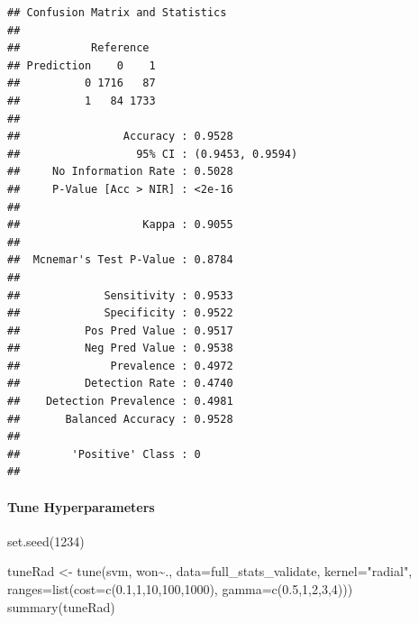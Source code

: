 \documentclass[
]{article}
\newenvironment{Shaded}{\begin{snugshade}}{\end{snugshade}}
\newcommand{\AttributeTok}[1]{\textcolor[rgb]{0.77,0.63,0.00}{#1}}
\newcommand{\DecValTok}[1]{\textcolor[rgb]{0.00,0.00,0.81}{#1}}
\newcommand{\FloatTok}[1]{\textcolor[rgb]{0.00,0.00,0.81}{#1}}
\newcommand{\FunctionTok}[1]{\textcolor[rgb]{0.00,0.00,0.00}{#1}}
\newcommand{\NormalTok}[1]{#1}
\newcommand{\OtherTok}[1]{\textcolor[rgb]{0.56,0.35,0.01}{#1}}
\newcommand{\SpecialCharTok}[1]{\textcolor[rgb]{0.00,0.00,0.00}{#1}}
\newcommand{\StringTok}[1]{\textcolor[rgb]{0.31,0.60,0.02}{#1}}
\begin{document}
\begin{verbatim}
## Confusion Matrix and Statistics
## 
##           Reference
## Prediction    0    1
##          0 1716   87
##          1   84 1733
##                                           
##                Accuracy : 0.9528          
##                  95% CI : (0.9453, 0.9594)
##     No Information Rate : 0.5028          
##     P-Value [Acc > NIR] : <2e-16          
##                                           
##                   Kappa : 0.9055          
##                                           
##  Mcnemar's Test P-Value : 0.8784          
##                                           
##             Sensitivity : 0.9533          
##             Specificity : 0.9522          
##          Pos Pred Value : 0.9517          
##          Neg Pred Value : 0.9538          
##              Prevalence : 0.4972          
##          Detection Rate : 0.4740          
##    Detection Prevalence : 0.4981          
##       Balanced Accuracy : 0.9528          
##                                           
##        'Positive' Class : 0               
## 
\end{verbatim}

\hypertarget{tune-hyperparameters}{%
\paragraph{Tune Hyperparameters}\label{tune-hyperparameters}}

\begin{Shaded}
\begin{Highlighting}[]
\FunctionTok{set.seed}\NormalTok{(}\DecValTok{1234}\NormalTok{)}

\NormalTok{tuneRad }\OtherTok{\textless{}{-}} \FunctionTok{tune}\NormalTok{(svm, won}\SpecialCharTok{\textasciitilde{}}\NormalTok{., }\AttributeTok{data=}\NormalTok{full\_stats\_validate, }\AttributeTok{kernel=}\StringTok{"radial"}\NormalTok{, }\AttributeTok{ranges=}\FunctionTok{list}\NormalTok{(}\AttributeTok{cost=}\FunctionTok{c}\NormalTok{(}\FloatTok{0.1}\NormalTok{,}\DecValTok{1}\NormalTok{,}\DecValTok{10}\NormalTok{,}\DecValTok{100}\NormalTok{,}\DecValTok{1000}\NormalTok{), }\AttributeTok{gamma=}\FunctionTok{c}\NormalTok{(}\FloatTok{0.5}\NormalTok{,}\DecValTok{1}\NormalTok{,}\DecValTok{2}\NormalTok{,}\DecValTok{3}\NormalTok{,}\DecValTok{4}\NormalTok{)))}
\FunctionTok{summary}\NormalTok{(tuneRad)}
\end{Highlighting}
\end{Shaded}
\end{document}
